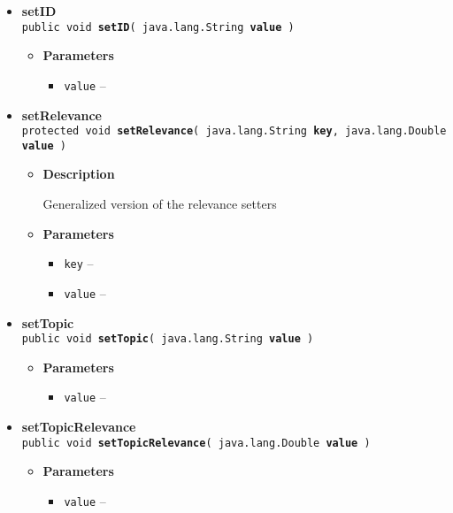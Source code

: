 {{{\begin{itemize}
{\begin{itemize}
{  \begin{itemize}
   \item{
{\tt value} -- }
  \end{itemize}
}%
\end{itemize}
}%
 \item{ 
{\bf setID}\\
{\tt public void\ {\bf setID}( {\tt java.lang.String} {\bf value} )
\label{amber.common.Analysis.setID(java.lang.String)}}%
\begin{itemize}
\item{
{\bf Parameters}
  \begin{itemize}
   \item{
{\tt value} -- }
  \end{itemize}
}%
\end{itemize}
}%
 \item{ 
{\bf setRelevance}\\
{\tt protected void\ {\bf setRelevance}( {\tt java.lang.String} {\bf key},
{\tt java.lang.Double} {\bf value} )
\label{amber.common.Analysis.setRelevance(java.lang.String, java.lang.Double)}}%
\begin{itemize}
\item{
{\bf Description}

Generalized version of the relevance setters
}
\item{
{\bf Parameters}
  \begin{itemize}
   \item{
{\tt key} -- }
   \item{
{\tt value} -- }
  \end{itemize}
}%
\end{itemize}
}%
 \item{ 
{\bf setTopic}\\
{\tt public void\ {\bf setTopic}( {\tt java.lang.String} {\bf value} )
\label{amber.common.Analysis.setTopic(java.lang.String)}}%
\begin{itemize}
\item{
{\bf Parameters}
  \begin{itemize}
   \item{
{\tt value} -- }
  \end{itemize}
}%
\end{itemize}
}%
 \item{ 
{\bf setTopicRelevance}\\
{\tt public void\ {\bf setTopicRelevance}( {\tt java.lang.Double} {\bf value} )
\label{amber.common.Analysis.setTopicRelevance(java.lang.Double)}}%
\begin{itemize}
\item{
{\bf Parameters}
  \begin{itemize}
   \item{
{\tt value} -- }
  \end{itemize}
}%
\end{itemize}
}%
\end{itemize}
}
}
}
